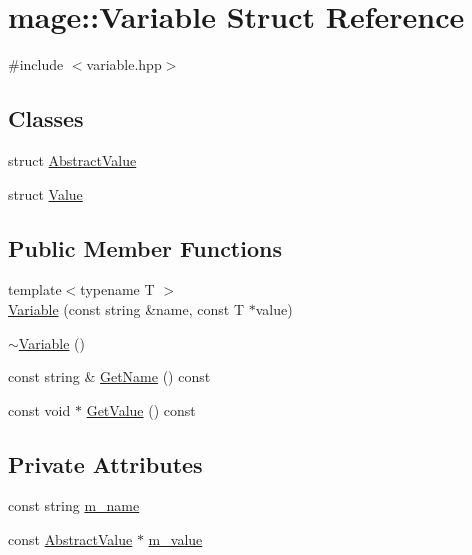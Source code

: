 \hypertarget{structmage_1_1_variable}{}\section{mage\+:\+:Variable Struct Reference}
\label{structmage_1_1_variable}


{\ttfamily \#include $<$variable.\+hpp$>$}

\subsection*{Classes}
\begin{DoxyCompactItemize}
\item 
struct \hyperlink{structmage_1_1_variable_1_1_abstract_value}{Abstract\+Value}
\item 
struct \hyperlink{structmage_1_1_variable_1_1_value}{Value}
\end{DoxyCompactItemize}
\subsection*{Public Member Functions}
\begin{DoxyCompactItemize}
\item 
{\footnotesize template$<$typename T $>$ }\\\hyperlink{structmage_1_1_variable_a79e412d8882a5adc1d5c4ac8587ed7e8}{Variable} (const string \&name, const T $\ast$value)
\item 
\hyperlink{structmage_1_1_variable_a8f4d3e950b25b14e996ad074e42a5e9e}{$\sim$\+Variable} ()
\item 
const string \& \hyperlink{structmage_1_1_variable_a7f70fdadf34cdf6b26adc9910eade11d}{Get\+Name} () const
\item 
const void $\ast$ \hyperlink{structmage_1_1_variable_a65ecc95bcdc26733394d3a32d3d698f1}{Get\+Value} () const
\end{DoxyCompactItemize}
\subsection*{Private Attributes}
\begin{DoxyCompactItemize}
\item 
const string \hyperlink{structmage_1_1_variable_afac262aa51bb1dfe447d501abcaa08d0}{m\+\_\+name}
\item 
const \hyperlink{structmage_1_1_variable_1_1_abstract_value}{Abstract\+Value} $\ast$ \hyperlink{structmage_1_1_variable_a99388f3fbccf983b8d6954fd31d0eb27}{m\+\_\+value}
\end{DoxyCompactItemize}


